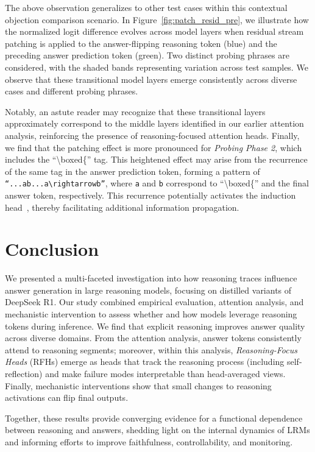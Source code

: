 \documentclass[11pt]{article}
\begin{document}
The above observation generalizes to other test cases within this contextual objection comparison scenario. In Figure~\ref{fig:patch_resid_pre}, we illustrate how the normalized logit difference evolves across model layers when residual stream patching is applied to the answer-flipping reasoning token (blue) and the preceding answer prediction token (green). Two distinct probing phrases are considered, with the shaded bands representing variation across test samples. We observe that these transitional model layers emerge consistently across diverse cases and different probing phrases.

Notably, an astute reader may recognize that these transitional layers approximately correspond to the middle layers identified in our earlier attention analysis, reinforcing the presence of reasoning-focused attention heads. Finally, we find that the patching effect is more pronounced for \textit{Probing Phase 2}, which includes the ``\textbackslash boxed\{'' tag. This heightened effect may arise from the recurrence of the same tag in the answer prediction token, forming a pattern of \texttt{``...ab...a$\rightarrow$b''}, where \texttt{a} and \texttt{b} correspond to ``\textbackslash boxed\{'' and the final answer token, respectively. This recurrence potentially activates the induction head~\cite{olsson2022incontextlearninginductionheads}, thereby facilitating additional information propagation.

\section{Conclusion}

We presented a multi-faceted investigation into how reasoning traces influence answer generation in large reasoning models, focusing on distilled variants of DeepSeek R1. Our study combined empirical evaluation, attention analysis, and mechanistic intervention to assess whether and how models leverage reasoning tokens during inference. We find that explicit reasoning improves answer quality across diverse domains. From the attention analysis, answer tokens consistently attend to reasoning segments; moreover, within this analysis, \emph{Reasoning-Focus Heads} (RFHs) emerge as heads that track the reasoning process (including self-reflection) and make failure modes interpretable than head-averaged views. Finally, mechanistic interventions show that small changes to reasoning activations can flip final outputs. 

Together, these results provide converging evidence for a functional dependence between reasoning and answers, shedding light on the internal dynamics of LRMs and informing efforts to improve faithfulness, controllability, and monitoring.
\end{document}
